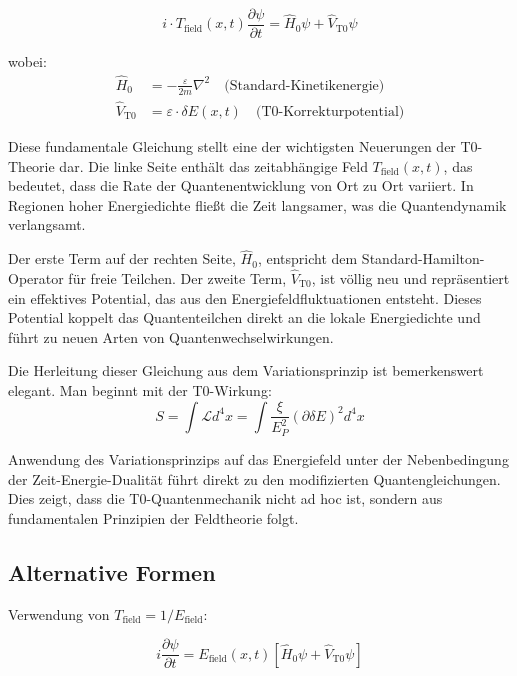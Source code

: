 \documentclass[12pt,a4paper]{article}
\newcommand{\deltaE}{\delta E}
\newcommand{\xipar}{\xi}
\newcommand{\EPlanck}{E_P}
\theoremstyle{definition}
\theoremstyle{remark}
\begin{document}
\begin{equation}
	\boxed{i \cdot T_{\text{field}}(x,t) \frac{\partial\psi}{\partial t} = \hat{H}_0 \psi + \hat{V}_{\text{T0}} \psi}
	\label{eq:t0_schrodinger_general}
\end{equation}

wobei:
\begin{align}
	\hat{H}_0 &= -\frac{\varepsilon}{2m} \nabla^2 \quad \text{(Standard-Kinetikenergie)} \\
	\hat{V}_{\text{T0}} &= \varepsilon \cdot \deltaE(x,t) \quad \text{(T0-Korrekturpotential)}
\end{align}

Diese fundamentale Gleichung stellt eine der wichtigsten Neuerungen der T0-Theorie dar. Die linke Seite enth{\"a}lt das zeitabh{\"a}ngige Feld $T_{\text{field}}(x,t)$, das bedeutet, dass die Rate der Quantenentwicklung von Ort zu Ort variiert. In Regionen hoher Energiedichte flie{\ss}t die Zeit langsamer, was die Quantendynamik verlangsamt.

Der erste Term auf der rechten Seite, $\hat{H}_0$, entspricht dem Standard-Hamilton-Operator f{\"u}r freie Teilchen. Der zweite Term, $\hat{V}_{\text{T0}}$, ist v{\"o}llig neu und repr{\"a}sentiert ein effektives Potential, das aus den Energiefeldfluktuationen entsteht. Dieses Potential koppelt das Quantenteilchen direkt an die lokale Energiedichte und f{\"u}hrt zu neuen Arten von Quantenwechselwirkungen.

Die Herleitung dieser Gleichung aus dem Variationsprinzip ist bemerkenswert elegant. Man beginnt mit der T0-Wirkung:
$$S = \int \mathcal{L} d^4x = \int \frac{\xipar}{\EPlanck^2} (\partial \deltaE)^2 d^4x$$

Anwendung des Variationsprinzips auf das Energiefeld unter der Nebenbedingung der Zeit-Energie-Dualit{\"a}t f{\"u}hrt direkt zu den modifizierten Quantengleichungen. Dies zeigt, dass die T0-Quantenmechanik nicht ad hoc ist, sondern aus fundamentalen Prinzipien der Feldtheorie folgt.

\subsection{Alternative Formen}

Verwendung von $T_{\text{field}} = 1/E_{\text{field}}$:

\begin{equation}
	\boxed{i \frac{\partial\psi}{\partial t} = E_{\text{field}}(x,t) \left[\hat{H}_0 \psi + \hat{V}_{\text{T0}} \psi\right]}
	\label{eq:t0_schrodinger_energy}
\end{equation}
\end{document}
